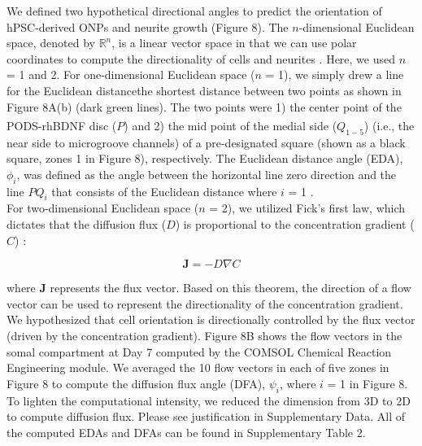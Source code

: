\documentclass[review]{elsarticle}
\begin{document}
\indent We defined two hypothetical directional angles to predict the orientation of hPSC-derived ONPs and neurite growth (Figure 8). The $n$-dimensional Euclidean space, denoted by $\mathbb{R}^{n}$, is a linear vector space in that we can use polar coordinates to compute the directionality of cells and neurites \cite{Axler2015}. Here, we used $n$ = 1 and 2. For one-dimensional Euclidean space ($n$ = 1), we simply drew a line for the Euclidean distance\textemdash the shortest distance between two points as shown in Figure 8A(b) (dark green lines).  The two points were 1) the center point of the PODS\textsuperscript{\textregistered}-rhBDNF disc ($P$) and 2) the mid point of the medial side ($Q_{1-5}$) (i.e., the near side to microgroove channels) of a pre-designated square (shown as a black square, zones 1 in Figure 8), respectively. The Euclidean distance angle (EDA), $\phi_{i}$, was defined as the angle between the horizontal line zero direction and the line $PQ_{i}$ that consists of the Euclidean distance where $i$ = 1 .\\

\indent For two-dimensional Euclidean space ($n$ = 2), we utilized Fick's first law, which dictates that the diffusion flux ($D$) is proportional to the concentration gradient ($C$) \cite{crank1979}:

\begin{equation}
	\textbf{J} = -D\nabla C
\end{equation}

 where \textbf{J} represents the flux vector. Based on this theorem, the direction of a flow vector can be used to represent the directionality of the concentration gradient. We hypothesized that cell orientation is directionally controlled by the flux vector (driven by the concentration gradient). Figure 8B shows the flow vectors in the somal compartment at Day 7 computed by the COMSOL Chemical Reaction Engineering module.  We averaged the 10 flow vectors in each of five zones in Figure 8 to compute the diffusion flux angle (DFA), $\psi_{i}$, where $i$ = 1 in Figure 8. To lighten the computational intensity, we reduced the dimension from 3D to 2D to compute diffusion flux. Please see justification in Supplementary Data. All of the computed EDAs and DFAs can be found in Supplementary Table 2. 
\end{document}
